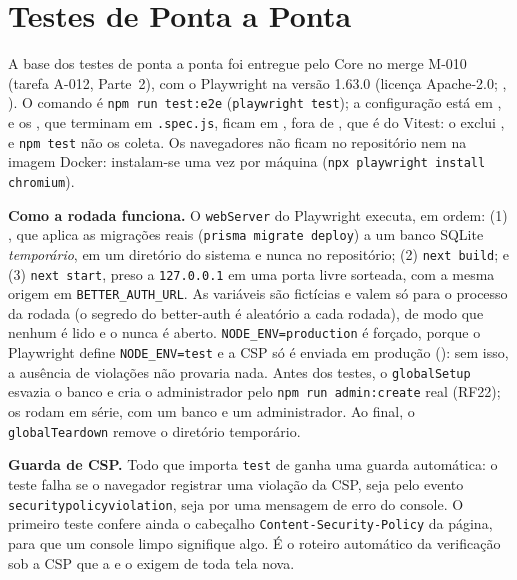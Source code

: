 \section{Testes de Ponta a Ponta}\label{sec:testes-e2e}

A base dos testes de ponta a ponta foi entregue pelo Core no merge M-010 (tarefa A-012, Parte~2), com o Playwright \cite{playwright} na versão 1.63.0 (licença Apache-2.0; , ). O comando é \texttt{npm run test:e2e} (\texttt{playwright test}); a configuração está em , e os , que terminam em \texttt{.spec.js}, ficam em , fora de , que é do Vitest: o  exclui , e \texttt{npm test} não os coleta. Os navegadores não ficam no repositório nem na imagem Docker: instalam-se uma vez por máquina (\texttt{npx playwright install chromium}).

\textbf{Como a rodada funciona.} O \texttt{webServer} do Playwright executa, em ordem: (1) , que aplica as migrações reais (\texttt{prisma migrate deploy}) a um banco SQLite \emph{temporário}, em um diretório do sistema e nunca no repositório; (2) \texttt{next build}; e (3) \texttt{next start}, preso a \texttt{127.0.0.1} em uma porta livre sorteada, com a mesma origem em \texttt{BETTER\_AUTH\_URL}. As variáveis são fictícias e valem só para o processo da rodada (o segredo do better-auth é aleatório a cada rodada), de modo que nenhum  é lido e o  nunca é aberto. \texttt{NODE\_ENV=production} é forçado, porque o Playwright define \texttt{NODE\_ENV=test} e a CSP só é enviada em produção (): sem isso, a ausência de violações não provaria nada. Antes dos testes, o \texttt{globalSetup} esvazia o banco e cria o administrador pelo \texttt{npm run admin:create} real (RF22); os  rodam em série, com um banco e um administrador. Ao final, o \texttt{globalTeardown} remove o diretório temporário.

\textbf{Guarda de CSP.} Todo  que importa \texttt{test} de  ganha uma guarda automática: o teste falha se o navegador registrar uma violação da CSP, seja pelo evento \texttt{securitypolicyviolation}, seja por uma mensagem de erro do console. O primeiro teste confere ainda o cabeçalho \texttt{Content-Security-Policy} da página, para que um console limpo signifique algo. É o roteiro automático da verificação sob a CSP que a  e o  exigem de toda tela nova.

